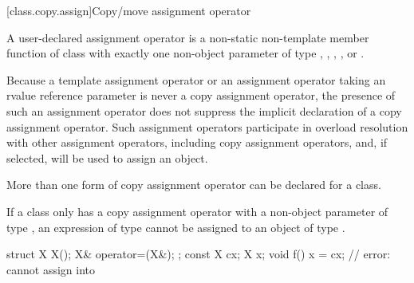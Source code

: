 [class.copy.assign]{Copy/move assignment operator}%

\pnum
{}%
%
%
%
%
%
%
A user-declared  assignment operator  is a
non-static non-template member function of class  with exactly one
non-object parameter of type , , ,
, or .
\begin{footnote}
Because
a template assignment operator or an assignment operator
taking an rvalue reference parameter is never a copy assignment operator,
the presence of such an assignment operator does not suppress the
implicit declaration of a copy assignment operator. Such assignment operators
participate in overload resolution with other assignment operators, including
copy assignment operators, and, if selected, will be used to assign an object.
\end{footnote}
\begin{note}
More than one form of copy assignment operator can be declared for a class.
\end{note}
\begin{note}
If a class
only has a copy assignment operator with a non-object parameter of type
,
an expression of type
cannot be assigned to an object of type
.
\begin{example}
\begin{codeblock}
struct X {
  X();
  X& operator=(X&);
};
const X cx;
X x;
void f() {
  x = cx;           // error:  cannot assign  into 
}
\end{codeblock}
\end{example}
\end{note}

